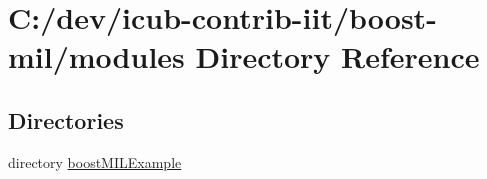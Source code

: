 \section{C\+:/dev/icub-\/contrib-\/iit/boost-\/mil/modules Directory Reference}
\label{dir_e05d7e2b1ecd646af5bb94391405f3b5}
\subsection*{Directories}
\begin{DoxyCompactItemize}
\item 
directory \hyperlink{dir_e71cd8fcd235e4fb369ba65b13bae578}{boost\+M\+I\+L\+Example}
\end{DoxyCompactItemize}
